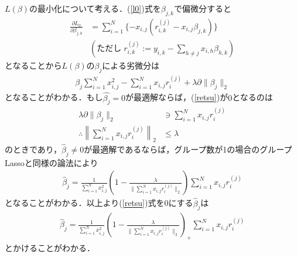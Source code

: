\documentclass{jsarticle}
\theoremstyle{definition}
\begin{document}
$L(\beta)$の最小化について考える．(\ref{l0})式を$\beta_{j,k}$で偏微分すると
\begin{align*}
\frac{\partial L_0}{\partial \beta_{j,k}}&=\sum_{i=1}^N\{-x_{i,j}(r_{i,k}^{(j)}-x_{i,j}\beta_{j,k})\}\\
&(ただし\;r_{i,k}^{(j)}:=y_{i,k}-\sum_{h\neq j}x_{i,h}\beta_{h,k})
\end{align*}
となることから$L(\beta)$の$\beta_j$による劣微分は
\begin{align}
\label{retsu}
\beta_j\sum_{i=1}^Nx_{i,j}^2-\sum_{i=1}^Nx_{i,j}r_i^{(j)}+\lambda\partial\|\beta_j\|_2
\end{align}
となることがわかる．もし$\hat{\beta_j}=0$が最適解ならば，(\ref{retsu})が$0$となるのは
\begin{align*}
\lambda\partial\|\beta_j\|_2&\ni\sum_{i=1}^Nx_{i,j}r_i^{(j)}\\
\therefore \left\|\sum_{i=1}^Nx_{i,j}r_i^{(j)}\right\|_2&\leq\lambda
\end{align*}
のときであり，$\hat{\beta}_j\neq 0$が最適解であるならば，グループ数が1の場合のグループLassoと同様の論法により
\begin{align*}
\hat{\beta}_j=\frac{1}{\sum_{i=1}^Nx_{i,j}^2}\left(1-\frac{\lambda}{\|\sum_{i=1}^Nx_{i,j}r_i^{(j)}\|_2}\right)\sum_{i=1}^Nx_{i,j}r_i^{(j)}
\end{align*}
となることがわかる．以上より(\ref{retsu})式を0にする$\hat{\beta}_j$は
\begin{align*}
\hat{\beta}_j=\frac{1}{\sum_{i=1}^Nx_{i,j}^2}\left(1-\frac{\lambda}{\|\sum_{i=1}^Nx_{i,j}r_i^{(j)}\|_2}\right)_+\sum_{i=1}^Nx_{i,j}r_i^{(j)}
\end{align*}
とかけることがわかる．
\end{document}
